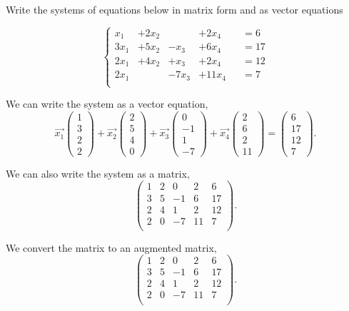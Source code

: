 \documentclass[]{article}
\begin{document}
Write the systems of equations below in matrix form and as vector equations
 
\[
\left\{
\begin{aligned}
  x_1 &+ 2x_2 &&+ 2x_4 &&= 6 \\
  3x_1 &+ 5x_2 &- x_3 &+ 6x_4 &&= 17 \\
  2x_1 &+ 4x_2 &+ x_3 &+ 2x_4 &&= 12 \\
  2x_1 &&- 7x_3 &+ 11x_4 &&= 7 \\
\end{aligned}
\right.
\]

We can write the system as a vector equation,
\[
\vec{x_1}\begin{pmatrix} 1\\3\\2\\2 \end{pmatrix}+
\vec{x_2}\begin{pmatrix} 2\\5\\4\\0 \end{pmatrix}+
\vec{x_3}\begin{pmatrix} 0\\-1\\1\\-7 \end{pmatrix}+
\vec{x_4}\begin{pmatrix} 2\\6\\2\\11 \end{pmatrix} =
\begin{pmatrix} 6\\17\\12\\7 \end{pmatrix} 
.\] 

We can also write the system as a matrix,
\[
  \left(
    \begin{array}{ccccc}
      1 & 2 & 0 & 2 & 6 \\
      3 & 5 & -1 & 6 & 17 \\
      2 & 4 & 1 & 2 & 12 \\
      2 & 0 & -7 & 11 & 7 \\
    \end{array}
  \right)
.\] 

We convert the matrix to an augmented matrix,
\[
  \left(
    \begin{array}{cccc|c}
      1 & 2 & 0 & 2 & 6 \\
      3 & 5 & -1 & 6 & 17 \\
      2 & 4 & 1 & 2 & 12 \\
      2 & 0 & -7 & 11 & 7 \\
    \end{array}
  \right)
.\] 
\end{document}
